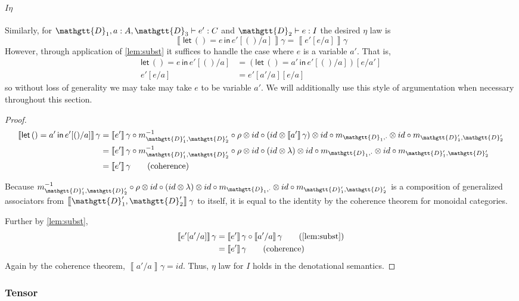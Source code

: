 \documentclass[acmsmall,nonacm]{acmart}
\renewcommand{\Delta}{\mathgtt{D}}
\newcommand{\sem}[1]{\left\llbracket{#1}\right\rrbracket}
\newcommand{\semg}[1]{\sem{#1}\gamma}
\newcommand{\letin}[3]{\mathsf{let}\, #1 = #2 \, \mathsf{in}\, #3}
\begin{document}
{\paragraph{$I\eta$}
Similarly, for $\Delta_{1}, a : A, \Delta_{3} \vdash e' : C$ and
$\Delta_{2} \vdash e : I$ the desired $\eta$ law is
\[
\semg{\letin {()} {e} {e'[()/a]}} = \semg{e'[e/a]}
\]
However, through application of \cref{lem:subst} it suffices to handle the case
where $e$ is a variable $a'$. That is,
\begin{align*}
\letin {()} {e} {e'[()/a]} &= (\letin {()} {a'} {e'[()/a]})[e/a'] \\
e'[e/a] &= e'[a'/a][e/a]
\end{align*}
so without loss of generality we may take may take $e$ to be variable $a'$. We
will additionally use this style of argumentation when necessary throughout this section.

\begin{proof}
\begin{align*}
  \semg{\letin {()} {a'} {e'[()/a]}}
  & = \semg{e'} \circ m^{-1}_{\Delta'_{1},\Delta'_{2}} \circ \rho \otimes id \circ (id \otimes \semg{a'}) \otimes id \circ m_{\Delta_{1},\cdot} \otimes id \circ m_{\Delta'_{1},\Delta'_{2}} \\
  & = \semg{e'} \circ m^{-1}_{\Delta'_{1},\Delta'_{2}} \circ \rho \otimes id \circ (id \otimes \lambda) \otimes id \circ m_{\Delta_{1},\cdot} \otimes id \circ m_{\Delta'_{1},\Delta'_{2}} \\
  & = \semg{e'} \tag{coherence}
\end{align*}

Because
$m^{-1}_{\Delta'_{1},\Delta'_{2}} \circ \rho \otimes id \circ (id \otimes \lambda) \otimes id \circ m_{\Delta_{1},\cdot} \otimes id \circ m_{\Delta'_{1},\Delta'_{2}}$
is a composition of generalized associators from
$\semg{\Delta'_{1},\Delta'_{2}}$ to itself, it is equal to the identity by the coherence theorem for monoidal categories.

Further by \cref{lem:subst},
\begin{align*}
  \semg{e'[a'/a]}
  &= \semg{e'} \circ \semg{a'/a} \tag{\cref{lem:subst}} \\
  &= \semg{e'} \tag{coherence}
\end{align*}
Again by the coherence theorem, $\semg{a'/a} = id$. Thus, $\eta$ law for $I$
holds in the denotational semantics.
\end{proof}

\subsubsection{Tensor}
}
\end{document}
